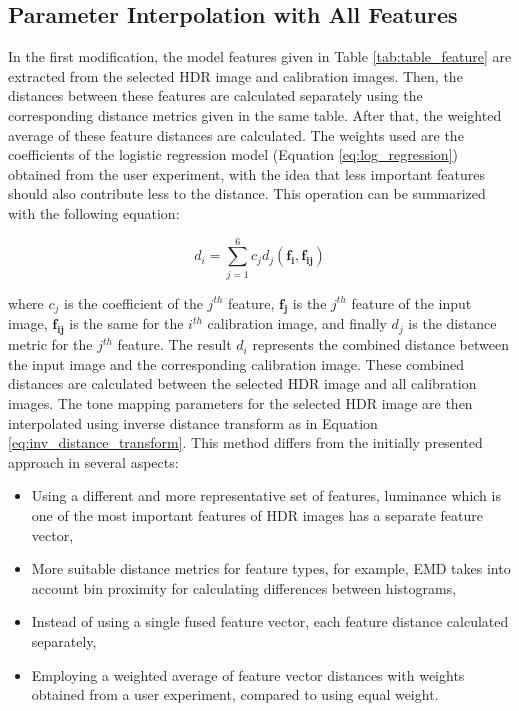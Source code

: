 \subsection{Parameter Interpolation with All Features}
\label{sec:all_features}

In the first modification, the model features given in Table \ref{tab:table_feature} are extracted from the selected HDR image and calibration images. Then, the distances between these features are calculated separately using the corresponding distance metrics given in the same table. After that, the weighted average of these feature distances are calculated. The weights used are the coefficients of the logistic regression model (Equation \ref{eq:log_regression}) obtained from the user experiment, with the idea that less important features should also contribute less to the distance. This operation can be summarized with the following equation:

\begin{equation}
    d_i = \sum_{j=1}^{6}c_j d_j(\mathbf{f_i}, \mathbf{f_{ij}})
\end{equation}

where $c_j$ is the coefficient of the $j^{th}$ feature, $\mathbf{f_j}$ is the $j^{th}$ feature of the input image, $\mathbf{f_{ij}}$ is the same for the $i^{th}$ calibration image, and finally $d_j$ is the distance metric for the $j^{th}$ feature. The result $d_i$ represents the combined distance between the input image and the corresponding calibration image. These combined distances are calculated between the selected HDR image and all calibration images. The tone mapping parameters for the selected HDR image are then interpolated using inverse distance transform as in Equation \ref{eq:inv_distance_transform}. This method differs from the initially presented approach in several aspects: 

\begin{itemize}
    \item Using a different and more representative set of features, luminance which is one of the most important features of HDR images has a separate feature vector,
    \item More suitable distance metrics for feature types, for example, EMD takes into account bin proximity for calculating differences between histograms,
    \item Instead of using a single fused feature vector, each feature distance calculated separately,
    \item Employing a weighted average of feature vector distances with weights obtained from a user experiment, compared to using equal weight.
\end{itemize}


